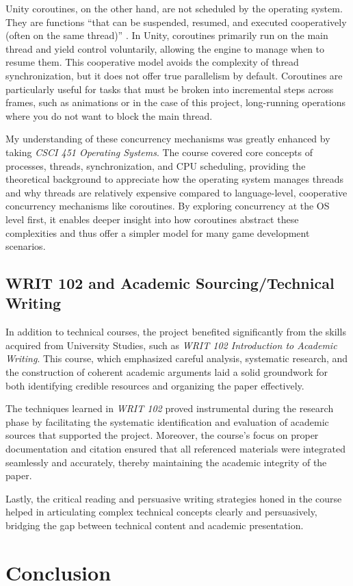 \documentclass[a4paper, 12pt, one column, aas_macros]{article}
\begin{document}
Unity coroutines, on the other hand, are not scheduled by the operating system. They are functions ``that can be suspended, resumed, and executed cooperatively (often on the same thread)'' \cite{nosenko}. In Unity, coroutines primarily run on the main thread and yield control voluntarily, allowing the engine to manage when to resume them. This cooperative model avoids the complexity of thread synchronization, but it does not offer true parallelism by default. Coroutines are particularly useful for tasks that must be broken into incremental steps across frames, such as animations or in the case of this project, long-running operations where you do not want to block the main thread.

My understanding of these concurrency mechanisms was greatly enhanced by taking \textit{CSCI 451 Operating Systems}. The course covered core concepts of processes, threads, synchronization, and CPU scheduling, providing the theoretical background to appreciate how the operating system manages threads and why threads are relatively expensive compared to language-level, cooperative concurrency mechanisms like coroutines. By exploring concurrency at the OS level first, it enables deeper insight into how coroutines abstract these complexities and thus offer a simpler model for many game development scenarios.

\subsection{WRIT 102 and Academic Sourcing/Technical Writing}
In addition to technical courses, the project benefited significantly from the skills acquired from University Studies, such as \textit{WRIT 102 Introduction to Academic Writing}. This course, which emphasized careful analysis, systematic research, and the construction of coherent academic arguments laid a solid groundwork for both identifying credible resources and organizing the paper effectively.

The techniques learned in \textit{WRIT 102} proved instrumental during the research phase by facilitating the systematic identification and evaluation of academic sources that supported the project. Moreover, the course’s focus on proper documentation and citation ensured that all referenced materials were integrated seamlessly and accurately, thereby maintaining the academic integrity of the paper.

Lastly, the critical reading and persuasive writing strategies honed in the course helped in articulating complex technical concepts clearly and persuasively, bridging the gap between technical content and academic presentation.

\section{Conclusion}


\end{document}

